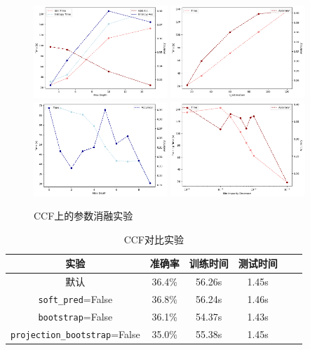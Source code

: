 \documentclass[a4paper]{article}
\begin{document}
\begin{figure}[h]
    \centering
    \includegraphics[width=0.45\textwidth,height=0.3\textwidth]{figs/11.png}
    \includegraphics[width=0.45\textwidth,height=0.3\textwidth]{figs/12.png}
    \includegraphics[width=0.45\textwidth,height=0.3\textwidth]{figs/13.png}
    \includegraphics[width=0.45\textwidth,height=0.3\textwidth]{figs/14.png}
    
    \caption{CCF上的参数消融实验}
    \label{fig:ccf_exp1}
\end{figure}

\begin{table}[ht]
\centering
\caption{CCF对比实验}
\begin{tabular}{|c|c|c|c|c|c|}
\hline
实验&准确率&训练时间&测试时间\\
\hline
默认 &36.4\%  &56.26s & 1.45s\\
\texttt{soft\_pred}=False & 36.8\% &56.24s & 1.46s\\
\texttt{bootstrap}=False & 36.1\% &54.37s & 1.43s\\
\texttt{projection\_bootstrap}=False & 35.0\% &55.38s & 1.45s\\
\hline
\end{tabular}
\label{table_ccf_exp}
\end{table}
\end{document}
